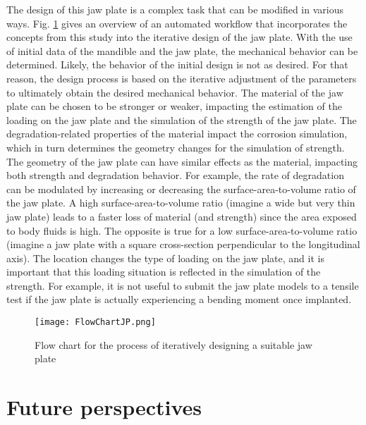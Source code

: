 The design of this jaw plate is a complex task that can be modified in various ways. Fig. \ref{fig:FlowChartJP} gives an overview of an automated workflow that incorporates the concepts from this study into the iterative design of the jaw plate. With the use of initial data of the mandible and the jaw plate, the mechanical behavior can be determined. Likely, the behavior of the initial design is not as desired. For that reason, the design process is based on the iterative adjustment of the parameters to ultimately obtain the desired mechanical behavior. The material of the jaw plate can be chosen to be stronger or weaker, impacting the estimation of the loading on the jaw plate and the simulation of the strength of the jaw plate. The degradation-related properties of the material impact the corrosion simulation, which in turn determines the geometry changes for the simulation of strength. The geometry of the jaw plate can have similar effects as the material, impacting both strength and degradation behavior. For example, the rate of degradation can be modulated by increasing or decreasing the surface-area-to-volume ratio of the jaw plate. A high surface-area-to-volume ratio (imagine a wide but very thin jaw plate) leads to a faster loss of material (and strength) since the area exposed to body fluids is high. The opposite is true for a low surface-area-to-volume ratio (imagine a jaw plate with a square cross-section perpendicular to the longitudinal axis). The location changes the type of loading on the jaw plate, and it is important that this loading situation is reflected in the simulation of the strength. For example, it is not useful to submit the jaw plate models to a tensile test if the jaw plate is actually experiencing a bending moment once implanted. %

\begin{figure}[h]
    \centering
    \texttt{[image: FlowChartJP.png]}
    \caption{Flow chart for the process of iteratively designing a suitable jaw plate}
    \label{fig:FlowChartJP}
\end{figure}

\section{Future perspectives}
\label{sec:future}

